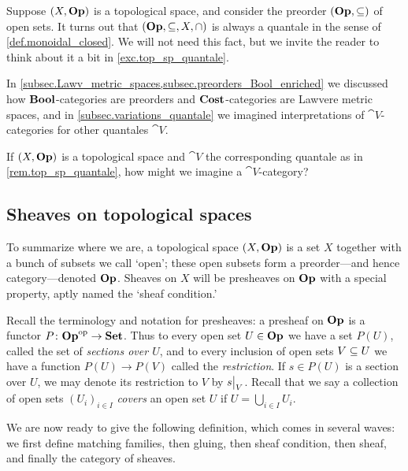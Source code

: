 \documentclass[7Sketches]{subfiles}
\begin{document}
\begin{remark}%
\label{rem.top_sp_quantale}%
Suppose $(X,\Op)$ is a topological space, and consider the preorder $(\Op,\ss)$ of open sets. It turns out that $(\Op,\ss,X,\cap)$ is always a quantale in the sense of \cref{def.monoidal_closed}. We will not need this fact, but we invite the reader to think about it a bit in \cref{exc.top_sp_quantale}.
\end{remark}

\begin{exercise}%
\label{exc.top_sp_quantale}%
In \cref{subsec.Lawv_metric_spaces,subsec.preorders_Bool_enriched} we discussed how $\Bool$-categories are preorders and $\Cost$-categories are Lawvere metric spaces, and in \cref{subsec.variations_quantale} we imagined interpretations of $\cat{V}$-categories for other quantales $\cat{V}$.

If $(X,\Op)$ is a topological space and $\cat{V}$ the corresponding quantale as in \cref{rem.top_sp_quantale}, how might we imagine a $\cat{V}$-category? 
\end{exercise}

\subsection{Sheaves on topological spaces}%
\label{subsec.sheaves_on_spaces}

To summarize where we are, a topological space $(X,\Op)$ is a set $X$ together with a bunch of subsets we call `open'; these open subsets form a preorder---and hence category---denoted $\Op$. Sheaves on $X$ will be presheaves on $\Op$ with a special property, aptly named the `sheaf condition.'

Recall the terminology and notation for presheaves: a presheaf on $\Op$ is a functor $P\colon \Op\op\to\smset$. Thus to every open set $U\in\Op$ we have a set $P(U)$, called the set of \emph{sections over $U$}, and to every inclusion of open sets $V\ss U$ we have a function $P(U)\to P(V)$ called the \emph{restriction}. If $s\in P(U)$ is a section over $U$, we may denote its restriction to $V$ by $\restrict{s}{V}$. Recall that we say a collection of open sets $(U_i)_{i\in I}$ \emph{covers} an open set $U$ if $U=\bigcup_{i\in I}U_i$.

We are now ready to give the following definition, which comes in several waves: we first define matching families, then gluing, then sheaf condition, then sheaf, and finally the category of sheaves.%
\end{document}
